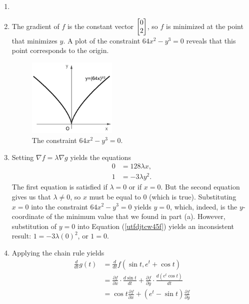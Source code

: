 \documentclass{article}
\begin{document}
\begin{enumerate}
\item %
\BEN
\item The gradient of $f$ is the constant vector $\begin{bmatrix} 0 \\ 2 \end{bmatrix}$, so $f$ is minimized at the point that minimizes $y$. A plot of the constraint $64x^2-y^3=0$ reveals that this point corresponds to the origin. 
\begin{figure}[H]
  \begin{center}
    \includegraphics[width=0.4\textwidth]{Mid2Curve.pdf}
      \caption{\small{The constraint $64x^2-y^3=0$.}}
  \end{center}
\end{figure}
\item Setting $\nabla f = \lambda \nabla g$ yields the equations
\begin{align}
  0 &=128 \lambda x , \\
  1 &=-3\lambda y^2 . \label{utfdjtcw45f}
\end{align}
The first equation is satisfied if $\lambda=0$ or if $x=0$. But the second equation gives us that $\lambda \ne 0$, so $x$ must be equal to 0 (which is true). Substituting $x=0$ into the constraint $64x^2-y^3=0$ yields $y=0$, which, indeed, is the $y$-coordinate of the minimum value that we found in part (a). However, substitution of $y=0$ into Equation (\ref{utfdjtcw45f}) yields an inconsistent result: $1 = -3\lambda (0)^2$, or $1=0$. 
\EEN
\item %
Applying the chain rule yields
\begin{align*}
  \frac{d}{dt}g(t)
  &=\frac{d}{dt} f(\sin t, e^t+\cos t) \\
  &= \frac{\partial f}{\partial x}\cdot\frac{d \sin t}{d t} +  \frac{\partial f}{\partial y}\cdot\frac{d (e^t \cos t)}{d t} \\
  &= \cos t\frac{\partial f}{\partial x} +  (e^t - \sin t) \frac{\partial f}{\partial y}

\end{align*}
\end{enumerate}
\end{document}
